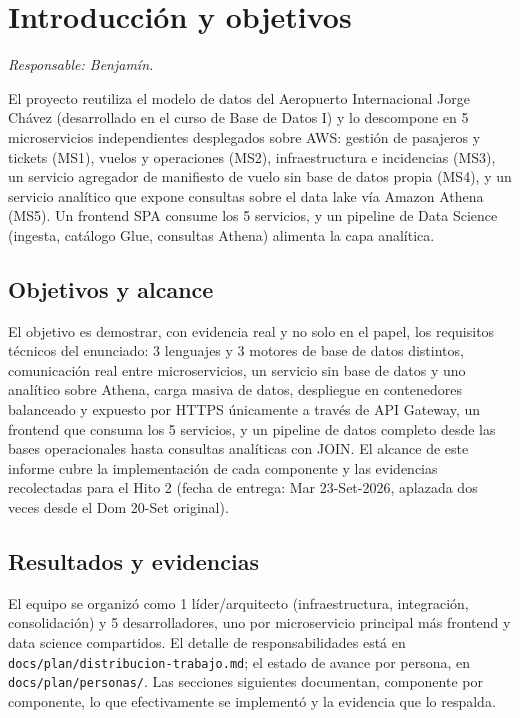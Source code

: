 \section{Introducción y objetivos}
\textit{Responsable: Benjamín.}

El proyecto reutiliza el modelo de datos del Aeropuerto Internacional Jorge Chávez (desarrollado en el
curso de Base de Datos I) y lo descompone en 5 microservicios independientes desplegados sobre AWS:
gestión de pasajeros y tickets (MS1), vuelos y operaciones (MS2), infraestructura e incidencias (MS3),
un servicio agregador de manifiesto de vuelo sin base de datos propia (MS4), y un servicio analítico
que expone consultas sobre el data lake vía Amazon Athena (MS5). Un frontend SPA consume los 5
servicios, y un pipeline de Data Science (ingesta, catálogo Glue, consultas Athena) alimenta la capa
analítica.

\subsection{Objetivos y alcance}

El objetivo es demostrar, con evidencia real y no solo en el papel, los requisitos técnicos del
enunciado: 3 lenguajes y 3 motores de base de datos distintos, comunicación real entre microservicios,
un servicio sin base de datos y uno analítico sobre Athena, carga masiva de datos, despliegue en
contenedores balanceado y expuesto por HTTPS únicamente a través de API Gateway, un frontend que
consuma los 5 servicios, y un pipeline de datos completo desde las bases operacionales hasta consultas
analíticas con JOIN. El alcance de este informe cubre la implementación de cada componente y las
evidencias recolectadas para el Hito 2 (fecha de entrega: Mar 23-Set-2026, aplazada dos veces desde el
Dom 20-Set original).

\subsection{Resultados y evidencias}

El equipo se organizó como 1 líder/arquitecto (infraestructura, integración, consolidación) y 5
desarrolladores, uno por microservicio principal más frontend y data science compartidos. El detalle de
responsabilidades está en \texttt{docs/plan/distribucion-trabajo.md}; el estado de avance por persona,
en \texttt{docs/plan/personas/}. Las secciones siguientes documentan, componente por componente, lo que
efectivamente se implementó y la evidencia que lo respalda.
